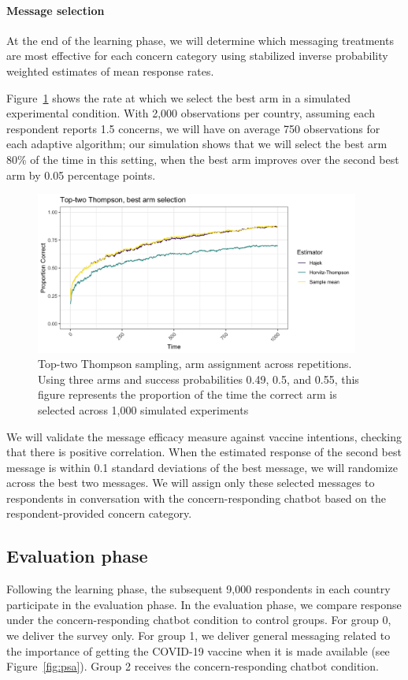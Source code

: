 \documentclass[letterpaper, 12pt, parskip=full,DIV=10]{scrartcl}
\begin{document}
\paragraph{Message selection}\label{message}

At the end of the learning phase, we will determine which messaging treatments are most effective for each concern category using stabilized inverse probability weighted estimates of mean response rates. 

Figure~\ref{fig:ttt_best} shows the rate at which we select the best arm in a simulated experimental condition. With 2,000 observations per country, assuming each respondent reports 1.5 concerns, we will have on average 750 observations for each adaptive algorithm; our simulation shows that we will select the best arm 80\% of the time in this setting, when the best arm improves over the second best arm by 0.05 percentage points.

\begin{figure}[htbp]
   \centering
   \includegraphics[width = 0.95\textwidth]{../../tables-figures/tt_correct.png}
   \caption{Top-two Thompson sampling, arm assignment across repetitions. Using three arms and success probabilities 0.49, 0.5, and 0.55, this figure represents the proportion of the time the correct arm is selected across 1,000 simulated experiments}
   \label{fig:ttt_best}
\end{figure}

We will validate the message efficacy measure against vaccine intentions, checking that there is positive correlation. When the estimated response of the second best message is within 0.1 standard deviations of the best message, we will randomize across the best two messages. We will assign only these selected messages to respondents in conversation with the concern-responding chatbot based on the respondent-provided concern category. 

\subsection{Evaluation phase}
Following the learning phase, the subsequent 9,000 respondents in each country participate in the evaluation phase. In the evaluation phase, we compare response under the concern-responding chatbot condition to control groups. For group 0, we deliver the survey only. For group 1, we deliver general messaging related to the importance of getting the COVID-19 vaccine when it is made available (see Figure~\ref{fig:psa}). Group 2 receives the concern-responding chatbot condition. 
\end{document}
